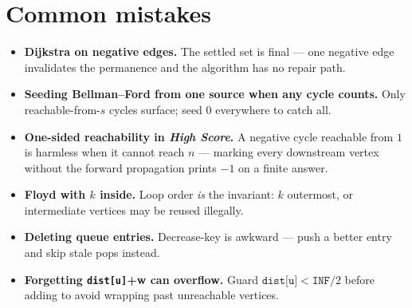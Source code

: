 \section{Common mistakes}
\begin{itemize}
\item \textbf{Dijkstra on negative edges.} The settled set is final
--- one negative edge invalidates the permanence and the algorithm
has no repair path.
\item \textbf{Seeding Bellman--Ford from one source when any cycle
counts.} Only reachable-from-$s$ cycles surface; seed 0 everywhere to
catch all.
\item \textbf{One-sided reachability in \emph{High Score}.} A
negative cycle reachable from $1$ is harmless when it cannot reach
$n$ --- marking every downstream vertex without the forward
propagation prints $-1$ on a finite answer.
\item \textbf{Floyd with $k$ inside.} Loop order \emph{is} the
invariant: $k$ outermost, or intermediate vertices may be reused
illegally.
\item \textbf{Deleting queue entries.} Decrease-key is awkward ---
push a better entry and skip stale pops instead.
\item \textbf{Forgetting \texttt{dist[u]}+w can overflow.} Guard
$\texttt{dist[u]} < \texttt{INF}/2$ before adding to avoid wrapping
past unreachable vertices.
\end{itemize}

